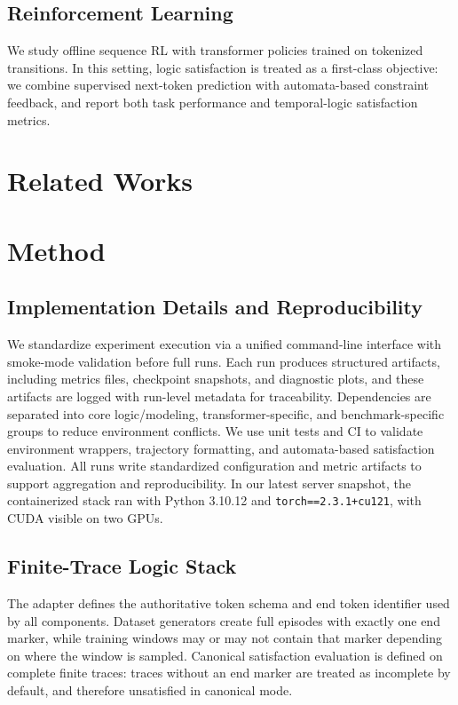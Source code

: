 \documentclass[runningheads]{llncs}
\begin{document}
\subsection{Reinforcement Learning}
We study offline sequence RL with transformer policies trained on tokenized transitions. In this setting, logic satisfaction is treated as a first-class objective: we combine supervised next-token prediction with automata-based constraint feedback, and report both task performance and temporal-logic satisfaction metrics.

\section{Related Works}

\section{Method}
\subsection{Implementation Details and Reproducibility}
We standardize experiment execution via a unified command-line interface with smoke-mode validation before full runs. Each run produces structured artifacts, including metrics files, checkpoint snapshots, and diagnostic plots, and these artifacts are logged with run-level metadata for traceability. Dependencies are separated into core logic/modeling, transformer-specific, and benchmark-specific groups to reduce environment conflicts. We use unit tests and CI to validate environment wrappers, trajectory formatting, and automata-based satisfaction evaluation. All runs write standardized configuration and metric artifacts to support aggregation and reproducibility. In our latest server snapshot, the containerized stack ran with Python 3.10.12 and \texttt{torch==2.3.1+cu121}, with CUDA visible on two GPUs.

\subsection{Finite-Trace Logic Stack}
The adapter defines the authoritative token schema and end token identifier used by all components. Dataset generators create full episodes with exactly one end marker, while training windows may or may not contain that marker depending on where the window is sampled. Canonical satisfaction evaluation is defined on complete finite traces: traces without an end marker are treated as incomplete by default, and therefore unsatisfied in canonical mode.
\end{document}
